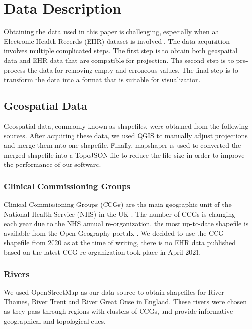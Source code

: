 \section{Data Description}

Obtaining the data used in this paper is challenging, especially when an Electronic Health Records (EHR) dataset is involved \cite{wang2021EHRa}. The data acquisition involves multiple complicated steps. The first step is to obtain both geospaital data and EHR data that are compatible for projection. The second step is to pre-process the data for removing empty and erroneous values. The final step is to transform the data into a format that is suitable for visualization.

\subsection{Geospatial Data}

Geospatial data, commonly known as shapefiles, were obtained from the following sources. After acquiring these data, we used QGIS \cite{qgisWelcome} to manually adjust projections and merge them into one shapefile. Finally, mapshaper \cite{blochMapshaper} is used to converted the merged shapefile into a TopoJSON \cite{TopoJSON} file to reduce the file size in order to improve the performance of our software.

\subsubsection{Clinical Commissioning Groups}

Clinical Commissioning Groups (CCGs) are the main geographic unit of the National Health Service (NHS) in the UK \cite{nhsNHS}. The number of CCGs is changing each year due to the NHS annual re-organization, the most up-to-date shapefile is available from the Open Geography portalx \cite{opengeographyportalxOpen}. We decided to use the CCG shapefile from 2020 as at the time of writing, there is no EHR data published based on the latest CCG re-organization took place in April 2021.

\subsubsection{Rivers}

We used OpenStreetMap \cite{openstreetmapRelation} as our data source to obtain shapefiles for River Thames, River Trent and River Great Ouse in England. These rivers were chosen as they pass through regions with clusters of CCGs, and provide informative geographical and topological cues. 

